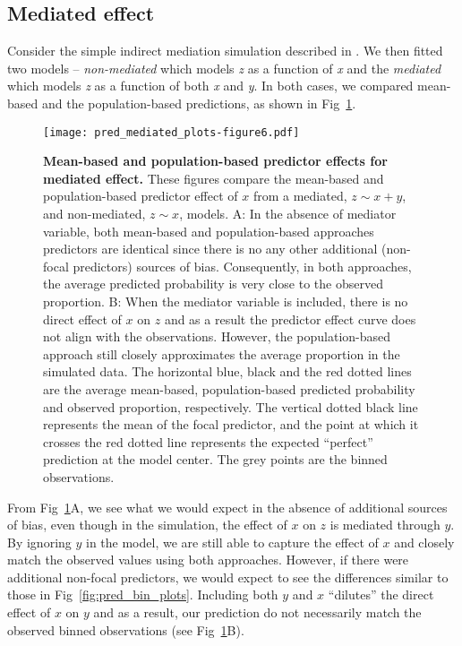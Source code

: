\documentclass[10pt,letterpaper]{article}
\begin{document}
\subsection*{Mediated effect}

Consider the simple indirect mediation simulation described in . We then fitted two models -- \emph{non-mediated} which models \emph{z} as a function of \emph{x} and the \emph{mediated} which models \emph{z} as a function of both \emph{x} and \emph{y}. In both cases, we compared mean-based and the population-based predictions, as shown in Fig~\ref{fig:pred_mediated_plots}.

\begin{figure}[!h]
\centering
\texttt{[image: pred\_mediated\_plots-figure6.pdf]}
\caption{{\bf Mean-based and population-based predictor effects for mediated effect.} These figures compare the mean-based and population-based predictor effect of $x$ from a mediated, $z \sim x + y$, and non-mediated, $z \sim x$, models. A: In the absence of mediator variable, both mean-based and population-based approaches predictors are identical since there is no any other additional (non-focal predictors) sources of bias. Consequently, in both approaches, the average predicted probability is very close to the observed proportion. B: When the mediator variable is included, there is no direct effect of $x$ on $z$ and as a result the predictor effect curve does not align with the observations. However, the population-based approach still closely approximates the average proportion in the simulated data. The horizontal blue, black and the red dotted lines are the average mean-based, population-based predicted probability and observed proportion, respectively. The vertical dotted black line represents the mean of the focal predictor, and the point at which it crosses the red dotted line represents the expected ``perfect'' prediction at the model center. The grey points are the binned observations.}
\label{fig:pred_mediated_plots}
\end{figure}

From Fig~\ref{fig:pred_mediated_plots}A, we see what we would expect in the absence of additional sources of bias, even though in the simulation, the effect of $x$ on $z$ is mediated through $y$. By ignoring $y$ in the model, we are still able to capture the effect of $x$ and closely match the observed values using both approaches. However, if there were additional non-focal predictors, we would expect to see the differences similar to those in Fig~\ref{fig:pred_bin_plots}. Including both $y$ and $x$ ``dilutes'' the direct effect of $x$ on $y$ and as a result, our prediction do not necessarily match the observed binned observations (see Fig~\ref{fig:pred_mediated_plots}B).
\end{document}
